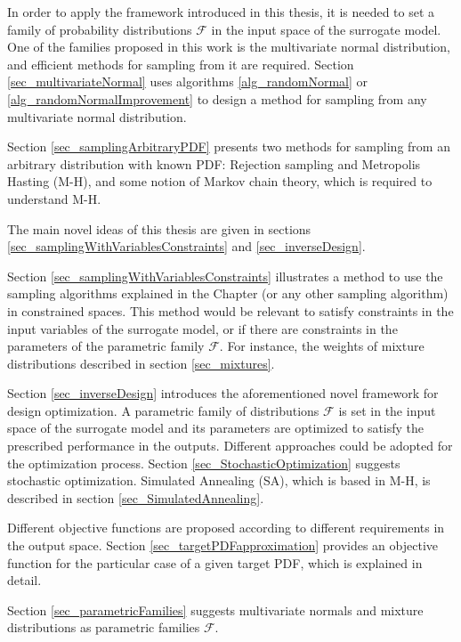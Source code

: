 In order to apply the framework introduced in this thesis, it is needed to set a family of probability distributions $\mathcal{F}$ in the input space of the surrogate model.
One of the families proposed in this work is the multivariate normal distribution, and efficient methods for sampling from it are required.
Section \ref{sec_multivariateNormal} uses algorithms \ref{alg_randomNormal} or \ref{alg_randomNormalImprovement} to design a method for sampling from any multivariate normal distribution.

Section \ref{sec_samplingArbitraryPDF} presents two methods for sampling from an arbitrary distribution with known PDF: Rejection sampling and Metropolis Hasting (M-H), and
some notion of Markov chain theory, which is required to understand M-H.  

The main novel ideas of this thesis are given in sections \ref{sec_samplingWithVariablesConstraints} and \ref{sec_inverseDesign}.

Section \ref{sec_samplingWithVariablesConstraints} illustrates a method to use the sampling algorithms explained in the Chapter (or any other sampling algorithm) in constrained spaces.
This method would be relevant to satisfy constraints in the input variables of the surrogate model, or if there are constraints in the parameters of the parametric family $\mathcal{F}$. For instance, the weights of mixture distributions described in section \ref{sec_mixtures}.

Section \ref{sec_inverseDesign} introduces the aforementioned novel framework for design optimization.%
A parametric family of distributions $\mathcal{F}$ is set in the input space of the surrogate model and its parameters are optimized to satisfy the prescribed performance in the outputs.
Different approaches could be adopted for the optimization process.
Section \ref{sec_StochasticOptimization} suggests stochastic optimization. 
Simulated Annealing (SA), which is based in M-H, is described in section \ref{sec_SimulatedAnnealing}.

Different objective functions are proposed according to different requirements in the output space.
Section \ref{sec_targetPDFapproximation} provides an objective function for the particular case of a given target PDF, which is explained in detail.

Section \ref{sec_parametricFamilies} suggests multivariate normals and mixture distributions as parametric families $\mathcal{F}$.

